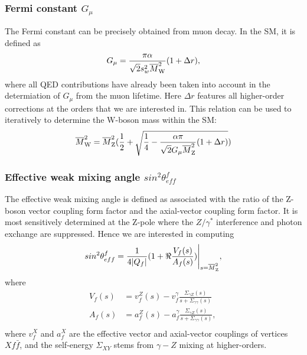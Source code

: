 \documentclass[Physsubmission, Phys]{SciPost}
\def\mathswitch#1{\relax\ifmmode#1\else$#1$\fi}
\def\mathswitchr#1{\relax\ifmmode{\mathrm{#1}}\else$\mathrm{#1}$\fi}
\newcommand{\PW}{\mathswitchr W}
\newcommand{\PZ}{\mathswitchr Z}
\newcommand{\mw}{\mathswitch {\overline{M}_\PW}}
\newcommand{\mz}{\mathswitch {\overline{M}_\PZ}}
\begin{document}
\subsubsection{Fermi constant $G_{\mu}$}\label{fermig}
The Fermi constant can be precisely obtained from muon decay. In the SM, it
is defined as
\begin{equation}
G_{\mu}=\frac{\pi\alpha}{\sqrt{2}s^2_w\mw^2}(1+\Delta r)\label{gmu},
\end{equation}
where all QED contributions have already been taken into account in the determiation of $G_{\mu}$ from the muon lifetime. Here $\Delta r$ features all higher-order corrections at the orders that we are interested in. This relation can be used to iteratively to determine the W-boson mass within the SM:
\begin{equation}
\mw^2=\mz^2(\frac{1}{2}+\sqrt{\frac{1}{4}-\frac{\alpha \pi}{\sqrt{2}G_{\mu}\mz^2}(1+\Delta r)})
\end{equation}\label{mw}

\subsubsection{Effective weak mixing angle $sin^2\theta_{eff}^f$}\label{sweff}
The effective weak mixing angle is defined as associated with the ratio of the Z-boson vector coupling form factor and the axial-vector coupling form factor. It is most sensitively determined at the Z-pole where the $Z/\gamma^*$ interference and photon exchange 
are suppressed. Hence we are interested in computing
\begin{equation}
sin^2\theta_{eff}^f=\frac{1}{4\lvert Q_f\rvert }(1+\Re{\frac{V_f(s)}{A_f(s)}})\Bigg\rvert_{s=\mz^2},
\end{equation}
where 
\begin{equation}\label{formfva}
\begin{split}
V_f(s)&=v_f^{Z}(s)-v_f^{\gamma}\frac{\Sigma_{\gamma Z}(s)}{s+\Sigma_{\gamma\gamma}(s)}\, \\
A_f(s)&=a_f^{Z}(s)-a_f^{\gamma}\frac{\Sigma_{\gamma Z}(s)}{s+\Sigma_{\gamma\gamma}(s)},\, \\
\end{split}
\end{equation}
where $v_f^X$ and $a_f^X$ are the effective vector and axial-vector couplings of vertices $Xf\bar{f}$, and the self-energy $\Sigma_{XY}$ stems from $\gamma-Z$ mixing at higher-orders.
\end{document}
